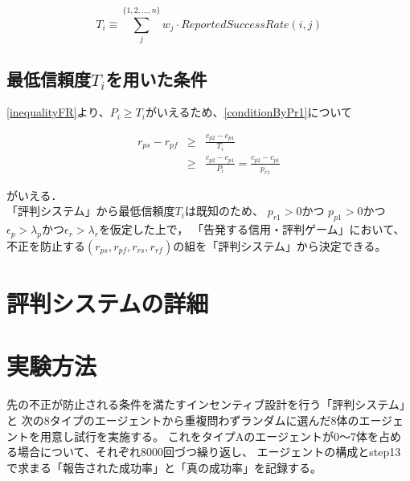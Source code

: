 \begin{equation}
  T_i \equiv \sum^{\{1,2,..., n\}}_{j} w_j \cdot ReportedSuccessRate(i, j) \label{conditionT_i}
\end{equation}

\subsection{最低信頼度$T_i$を用いた条件}

\eqref{inequalityFR}より、$ P_i \geq T_i $がいえるため、\eqref{conditionByPr1}について

\begin{eqnarray}
  r_{ps} - r_{pf} &\geq& \frac{c_{p2} - c_{p1}}{T_i} \\
                  &\geq& \frac{c_{p2} - c_{p1}}{P_i} = \frac{c_{p2} - c_{p1}}{p_{r1}} \nonumber
\end{eqnarray}

がいえる．\\

「評判システム」から最低信頼度$T_i$は既知のため、
$p_{r1} > 0$かつ $p_{p1} > 0$かつ$ \epsilon_p > \lambda_p $かつ$ \epsilon_r > \lambda_r $を仮定した上で，
「告発する信用・評判ゲーム」において、不正を防止する$ (r_{ps}, r_{pf}, r_{rs}, r_{rf}) $の組を「評判システム」から決定できる。

\section{評判システムの詳細}


\section{実験方法}
先の不正が防止される条件を満たすインセンティブ設計を行う「評判システム」と
次の8タイプのエージェントから重複問わずランダムに選んだ8体のエージェントを用意し試行を実施する。
これをタイプAのエージェントが0〜7体を占める場合について、それぞれ8000回づつ繰り返し、
エージェントの構成とstep13で求まる「報告された成功率」と「真の成功率」を記録する。

